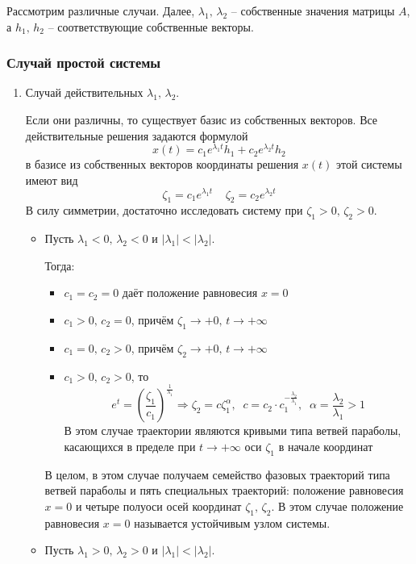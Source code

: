 \documentclass[a4paper,12pt]{article}
\theoremstyle{plain}
\theoremstyle{definition}
\theoremstyle{remark}
\begin{document}
Рассмотрим различные случаи. Далее, $\lambda_1,\,\lambda_2$ -- собственные значения матрицы $A$, а $h_1,\,h_2$ -- соответствующие собственные векторы.
\subsubsection*{Случай простой системы}
\begin{enumerate}
	\item Случай действительных $\lambda_1,\,\lambda_2$.

	      Если они различны, то существует базис из собственных векторов. Все действительные решения задаются формулой
	      \[x(t) = c_1e^{\lambda_1 t}h_1 + c_2e^{\lambda_2 t}h_2\]
	      в базисе из собственных векторов координаты решения $x(t)$ этой системы имеют вид
	      \[\zeta_1 = c_1e^{\lambda_1 t}\;\;\;\; \zeta_2 = c_2e^{\lambda_2 t}\]
	      В силу симметрии, достаточно исследовать систему при $\zeta_1 > 0,\, \zeta_2 > 0$.
	      \begin{itemize}
		      \item Пусть $\lambda_1 < 0,\, \lambda_2 < 0$ и $|\lambda_1| < |\lambda_2|$.

		            Тогда:
		            \begin{itemize}
			            \item $c_1 = c_2 = 0$ даёт положение равновесия $x = 0$
			            \item $c_1 > 0,\, c_2 = 0$, причём $\zeta_1 \to +0,\, t \to +\infty$
			            \item $c_1 = 0,\, c_2 > 0$, причём $\zeta_2 \to +0,\, t \to +\infty$
			            \item $c_1 > 0,\, c_2 > 0$, то
			                  \[e^t = \left(\frac{\zeta_1}{c_1}\right)^{\frac{1}{\lambda_1}} \Rightarrow \zeta_2 = c\zeta_1^\alpha,\;\; c = c_2 \cdot c_1^{-\frac{\lambda_2}{\lambda_1}},\;\; \alpha = \frac{\lambda_2}{\lambda_1} > 1\]
			                  В этом случае траектории являются кривыми типа ветвей параболы, касающихся в пределе при $t \to +\infty$ оси $\zeta_1$ в начале координат
		            \end{itemize}
		            В целом, в этом случае получаем семейство фазовых траекторий типа ветвей параболы и пять специальных траекторий: положение равновесия $x = 0$ и четыре полуоси осей координат $\zeta_1,\,\zeta_2$. В этом случае положение равновесия $x = 0$ называется устойчивым узлом системы.
		      \item Пусть $\lambda_1 > 0,\, \lambda_2 > 0$ и $|\lambda_1| < |\lambda_2|$.


\end{itemize}
\end{enumerate}
\end{document}
